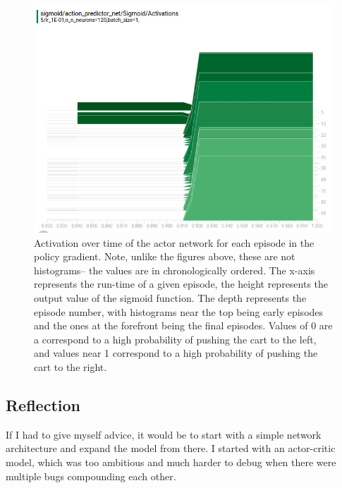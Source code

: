 \documentclass[12pt,a4paper]{article}
\begin{document}
\begin{figure}[htbp]
\begin{center}
\includegraphics[width=\linewidth]{pg_stuck.png}
\caption{Activation over time of the actor network for each episode in the policy gradient. Note, unlike the figures above, these are not histograms-- the values are in chronologically ordered. The x-axis represents the run-time of a given episode, the height represents the output value of the sigmoid function. The depth represents the episode number, with histograms near the top being early episodes and the ones at the forefront being the final episodes. Values of 0 are a correspond to a high probability of pushing the cart to the left, and values near 1 correspond to a high probability of pushing the cart to the right.}
\label{pg_stuck}
\end{center}
\end{figure}

\subsection*{Reflection}
If I had to give myself advice, it would be to start with a simple network architecture and expand the model from there. I started with an actor-critic model, which was too ambitious and much harder to debug when there were multiple bugs compounding each other.
\end{document}
